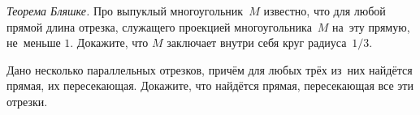 \begin{problems}


\item
\emph{Теорема Бляшке.}
Про выпуклый многоугольник~$M$ известно, что для любой прямой длина отрезка,
служащего проекцией многоугольника~$M$ на~эту прямую, не~меньше $1$.
Докажите, что $M$ заключает внутри себя круг радиуса~$1/3$.

\item
Дано несколько параллельных отрезков, причём для любых трёх из~них найдётся
прямая, их пересекающая.
Докажите, что найдётся прямая, пересекающая все эти отрезки.


\end{problems}
